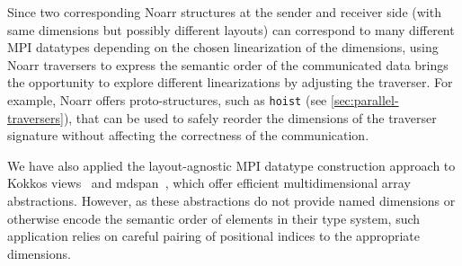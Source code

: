 Since two corresponding Noarr structures at the sender and receiver side (with same dimensions but possibly different layouts) can correspond to many different MPI datatypes depending on the chosen linearization of the dimensions, using Noarr traversers to express the semantic order of the communicated data brings the opportunity to explore different linearizations by adjusting the traverser. For example, Noarr offers proto-structures, such as \lstinline{hoist} (see \cref{sec:parallel-traversers}), that can be used to safely reorder the dimensions of the traverser signature without affecting the correctness of the communication.

We have also applied the layout-agnostic MPI datatype construction approach to Kokkos views~\cite{trott2021kokkos} and mdspan~\cite{trott2022mdspan}, which offer efficient multidimensional array abstractions. However, as these abstractions do not provide named dimensions or otherwise encode the semantic order of elements in their type system, such application relies on careful pairing of positional indices to the appropriate dimensions.

